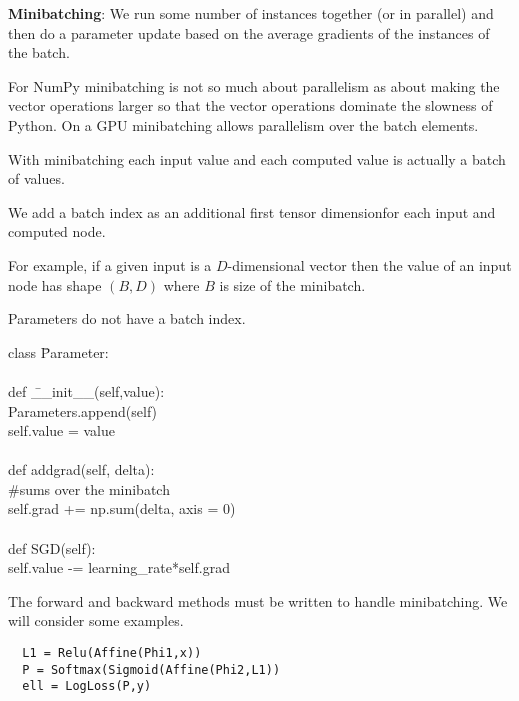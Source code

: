 { \vfill
{\bf Minibatching}: We run some number of instances together (or in parallel) and then do a parameter update based on the average
gradients of the instances of the batch.

\vfill
For NumPy minibatching is not so much about parallelism as about making the vector operations larger so that the vector operations dominate
the slowness of Python.  On a GPU minibatching allows parallelism over the batch elements.
\vfill

\vfill
With minibatching each input value and each computed value is actually a batch of values.

\vfill
We add a batch index as an additional first tensor dimensionfor each input and computed node.

\vfill
For example, if a given input is a $D$-dimensional vector then the value of an input node
has shape $(B,D)$ where $B$ is size of the minibatch.

\vfill
Parameters do not have a batch index.

\vfill
\eject
\vfill
\begin{tabbing}
class \=Parameter: \\
    \\
    \>def \=\_\_init\_\_(self,value): \\
        \>\>Parameters.append(self) \\
        \>\>self.value = value \\
\\
    \>def \>addgrad(self, delta): \\
          \>\>\#sums over the minibatch \\
    \>\>self.grad += np.sum(delta, axis = 0) \\
    \\
    \>def \>SGD(self): \\
    \>\>self.value -= learning\_rate*self.grad
\end{tabbing}


The forward and backward methods must be written to handle minibatching.  We will consider some examples.



\vfill
\begin{verbatim}
  L1 = Relu(Affine(Phi1,x))
  P = Softmax(Sigmoid(Affine(Phi2,L1))
  ell = LogLoss(P,y)
\end{verbatim}



}
